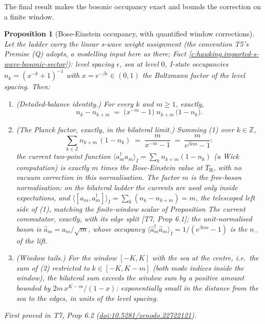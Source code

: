 \documentclass[11pt]{article}
\newtheorem{proposition}[theorem]{Proposition}
\theoremstyle{definition}
\theoremstyle{plain}
\providecommand{\TH}{}\renewcommand{\TH}{T_{\mathrm{H}}}
\providecommand{\Z}{}\renewcommand{\Z}{\mathbb{Z}}
\begin{document}
The final result makes the bosonic occupancy exact and bounds the correction on a finite window.

\begin{proposition}[Bose-Einstein occupancy, with quantified window corrections]\label{c:hawking.bose-einstein-occupancy-quantified-window-corrections}
Let the ladder carry the linear s-wave weight assignment (the convention T5's Premise (Q) adopts, a modelling input here as there; Fact \ref{c:hawking.imported-s-wave-bosonic-sector}): level spacing $\epsilon$, sea at level $0$, I-state occupancies $n_k = (x^{-k} + 1)^{-1}$ with $x = e^{-\beta\epsilon} \in (0,1)$ the Boltzmann factor of the level spacing. Then:
\begin{enumerate}
\item \emph{(Detailed-balance identity.)} For every $k$ and $m \ge 1$, exactly,
\[
n_k - n_{k+m} \;=\; \bigl(x^{-m} - 1\bigr)\; n_{k+m}\,\bigl(1 - n_k\bigr).
\]
\item \emph{(The Planck factor, exactly, in the bilateral limit.)} Summing (1) over $k \in \Z$,
\[
\sum_{k \in \Z} n_{k+m}\,(1 - n_k) \;=\; \frac{m}{x^{-m} - 1} \;=\; \frac{m}{e^{\beta\epsilon m} - 1}:
\]
the current two-point function $\langle a_m^\dagger a_m\rangle_I = \sum_k n_{k+m}(1 - n_k)$ (a Wick computation) is exactly $m$ times the Bose-Einstein value at $\TH$, with no vacuum correction in this normalisation. The factor $m$ is the free-boson normalisation: on the bilateral ladder the currents are used only inside expectations, and $\langle [a_m, a_m^\dagger]\rangle_I = \sum_k (n_k - n_{k+m}) = m$, the telescoped left side of (1), matching the finite-window scalar of Proposition \emph{The current commutator, exactly, with its edge split} [T7, Prop 6.1]; the unit-normalised boson is $\hat a_m = a_m/\sqrt{m}$, whose occupancy $\langle \hat a_m^\dagger \hat a_m\rangle_I = 1/(e^{\beta\epsilon m} - 1)$ is the $n_-$ of the lift.
\item \emph{(Window tails.)} For the window $[-K, K]$ with the sea at the centre, i.e.\ the sum of (2) restricted to $k \in [-K, K-m]$ (both mode indices inside the window), the bilateral sum exceeds the window sum by a positive amount bounded by $2m\,x^{K - m}/(1 - x)$: exponentially small in the distance from the sea to the edges, in units of the level spacing.
\end{enumerate}
\emph{First proved in} T7, Prop 6.2 (\href{https://doi.org/10.5281/zenodo.22722121}{doi:10.5281/zenodo.22722121}).
\end{proposition}
\end{document}
